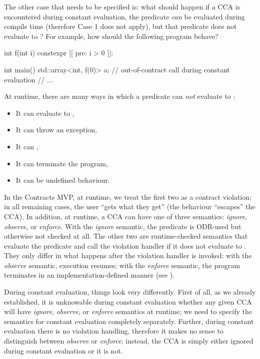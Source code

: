 The other case that needs to be specified is: what should happen if a CCA is encountered during constant evaluation, the predicate \emph{can} be evaluated during compile time (therefore Case 1 does not apply), but that predicate does not evaluate to ? For example, how should the following program behave?

\begin{codeblock}
int f(int i) constexpr [[ pre: i > 0 ]];

int main() {
  std::array<int, f(0)> a;  // out-of-contract call during constant evaluation
  // ...
}
\end{codeblock}

At runtime, there are many ways in which a predicate can \emph{not} evaluate to :

\begin{itemize}
\item It can evaluate to ,
\item It can throw an exception,
\item It can ,
\item It can terminate the program,
\item It can be undefined behaviour.
\end{itemize}

In the Contracts MVP, at runtime, we treat the first two as a contract violation; in all remaining cases, the user ``gets what they get'' (the behaviour ``escapes'' the CCA). In addition, at runtime, a CCA can have one of three semantics: \emph{ignore}, \emph{observe}, or \emph{enforce}. With the \emph{ignore} semantic, the predicate is ODR-used but otherwise not checked at all. The other two are runtime-checked semantics that evaluate the predicate and call the violation handler if it does not evaluate to . They only differ in what happens after the violation handler is invoked: with the \emph{observe} semantic, execution resumes; with the \emph{enforce} semantic, the program terminates in an implementation-defined manner (see \cite{P2811R7}).

During constant evaluation, things look very differently. First of all, as we already established, it is unknowable during constant evaluation whether any given CCA will have \emph{ignore}, \emph{observe}, or \emph{enforce} semantics at runtime; we need to specify the semantics for constant evaluation completely separately. Further, during constant evaluation there is no violation handling, therefore it makes no sense to distinguish between \emph{observe} or \emph{enforce}; instead, the CCA is simply either ignored during constant evaluation or it is not.

